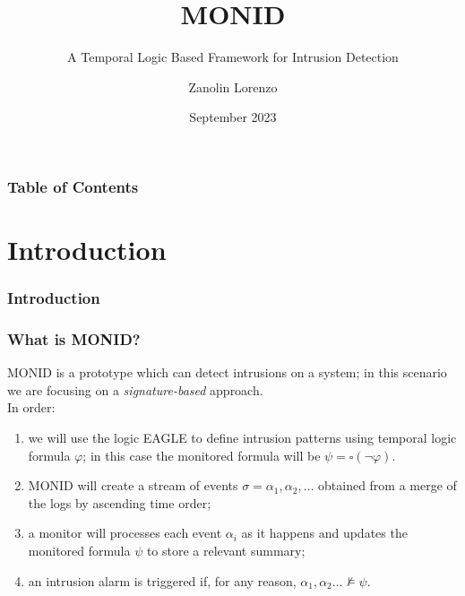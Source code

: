 \documentclass[aspectratio=169,t,xcolor=table]{beamer}
\begin{document}
\title[Inf UFG]{MONID}
\subtitle{A Temporal Logic Based Framework for Intrusion Detection}

\author{Zanolin Lorenzo}

\date{September 2023}
\frame[noframenumbering]{\titlepage}


\begin{frame}
    \frametitle{Table of Contents}
    \tableofcontents
\end{frame}

\section{Introduction}

\begin{frame}{}
    \frametitle{Introduction}
\end{frame}

\begin{frame}
    \frametitle{What is MONID?}
    MONID is a prototype which can detect intrusions on a system; in this scenario we are focusing on a \textit{signature-based} approach.\\
    \vspace{5mm}
    In order:
    \begin{enumerate}
        \item we will use the logic EAGLE to define intrusion patterns using temporal logic formula $\varphi$; in this case the monitored formula will be $\psi=\square (\neg\varphi)$.
        \item MONID will create a stream of events $\sigma=\alpha_{1},\alpha_{2},\ldots$ obtained from a merge of the logs by ascending time order;
        \item a monitor will processes each event $\alpha_i$ as it happens and updates the monitored formula $\psi$ to store a relevant summary;
        \item an intrusion alarm is triggered if, for any reason, $\alpha_{1},\alpha_{2} \ldots\not\models\psi$.
    \end{enumerate}
    
\end{frame}
\end{document}
